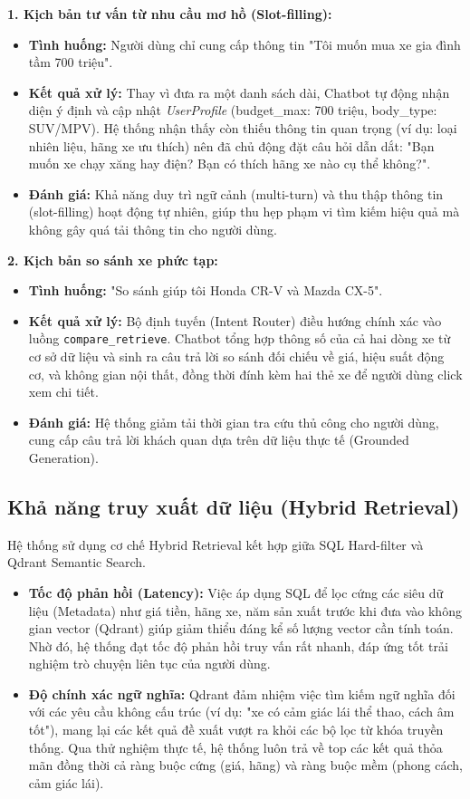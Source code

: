\textbf{1. Kịch bản tư vấn từ nhu cầu mơ hồ (Slot-filling):}
\begin{itemize}
    \item \textbf{Tình huống:} Người dùng chỉ cung cấp thông tin "Tôi muốn mua xe gia đình tầm 700 triệu".
    \item \textbf{Kết quả xử lý:} Thay vì đưa ra một danh sách dài, Chatbot tự động nhận diện ý định và cập nhật \textit{UserProfile} (budget\_max: 700 triệu, body\_type: SUV/MPV). Hệ thống nhận thấy còn thiếu thông tin quan trọng (ví dụ: loại nhiên liệu, hãng xe ưu thích) nên đã chủ động đặt câu hỏi dẫn dắt: "Bạn muốn xe chạy xăng hay điện? Bạn có thích hãng xe nào cụ thể không?".
    \item \textbf{Đánh giá:} Khả năng duy trì ngữ cảnh (multi-turn) và thu thập thông tin (slot-filling) hoạt động tự nhiên, giúp thu hẹp phạm vi tìm kiếm hiệu quả mà không gây quá tải thông tin cho người dùng.
\end{itemize}

\textbf{2. Kịch bản so sánh xe phức tạp:}
\begin{itemize}
    \item \textbf{Tình huống:} "So sánh giúp tôi Honda CR-V và Mazda CX-5".
    \item \textbf{Kết quả xử lý:} Bộ định tuyến (Intent Router) điều hướng chính xác vào luồng \texttt{compare\_retrieve}. Chatbot tổng hợp thông số của cả hai dòng xe từ cơ sở dữ liệu và sinh ra câu trả lời so sánh đối chiếu về giá, hiệu suất động cơ, và không gian nội thất, đồng thời đính kèm hai thẻ xe để người dùng click xem chi tiết.
    \item \textbf{Đánh giá:} Hệ thống giảm tải thời gian tra cứu thủ công cho người dùng, cung cấp câu trả lời khách quan dựa trên dữ liệu thực tế (Grounded Generation).
\end{itemize}

\subsection{Khả năng truy xuất dữ liệu (Hybrid Retrieval)}
Hệ thống sử dụng cơ chế Hybrid Retrieval kết hợp giữa SQL Hard-filter và Qdrant Semantic Search. 
\begin{itemize}
    \item \textbf{Tốc độ phản hồi (Latency):} Việc áp dụng SQL để lọc cứng các siêu dữ liệu (Metadata) như giá tiền, hãng xe, năm sản xuất trước khi đưa vào không gian vector (Qdrant) giúp giảm thiểu đáng kể số lượng vector cần tính toán. Nhờ đó, hệ thống đạt tốc độ phản hồi truy vấn rất nhanh, đáp ứng tốt trải nghiệm trò chuyện liên tục của người dùng.
    \item \textbf{Độ chính xác ngữ nghĩa:} Qdrant đảm nhiệm việc tìm kiếm ngữ nghĩa đối với các yêu cầu không cấu trúc (ví dụ: "xe có cảm giác lái thể thao, cách âm tốt"), mang lại các kết quả đề xuất vượt ra khỏi các bộ lọc từ khóa truyền thống. Qua thử nghiệm thực tế, hệ thống luôn trả về top các kết quả thỏa mãn đồng thời cả ràng buộc cứng (giá, hãng) và ràng buộc mềm (phong cách, cảm giác lái).
\end{itemize}

